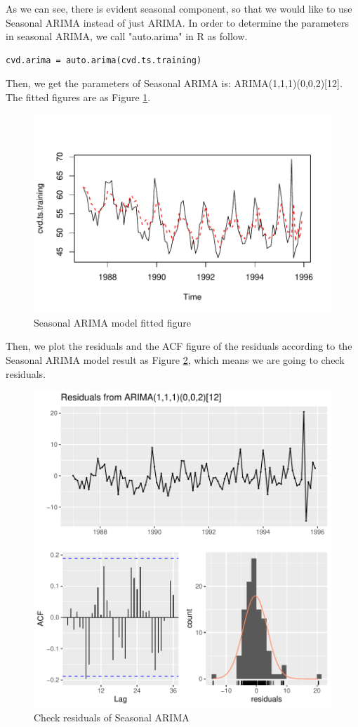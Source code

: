 \documentclass{article}
\begin{document}
As we can see, there is evident seasonal component, so that we would like to use Seasonal ARIMA instead of just ARIMA. In order to determine the parameters in seasonal ARIMA, we call "auto.arima" in R as follow. 
\begin{lstlisting}
cvd.arima = auto.arima(cvd.ts.training)
\end{lstlisting}
Then, we get the parameters of Seasonal ARIMA is:
ARIMA(1,1,1)(0,0,2)[12]. The fitted figures are as Figure \ref{arima-fit}.
\begin{figure}[H]
    \centering
    \includegraphics[width=0.65\linewidth]{images/cvd-arima-fit}
    \caption{Seasonal ARIMA model fitted figure}
    \label{arima-fit}
\end{figure}
Then, we plot the residuals and the ACF figure of the residuals according to the Seasonal ARIMA model result as Figure \ref{arima}, which means we are going to check residuals.
\begin{figure}[H]
    \centering
    \includegraphics[width=0.65\linewidth]{images/cvd-arima-check}
    \caption{Check residuals of Seasonal ARIMA}
    \label{arima}
\end{figure}
\end{document}

